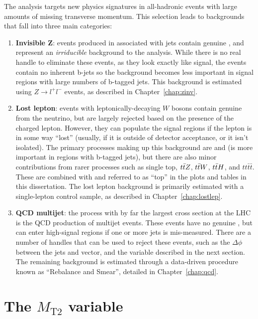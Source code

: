 The \mttwo analysis targets new physics signatures in all-hadronic events with large amounts of missing transverse momentum.
This selection leads to backgrounds that fall into three main categories:
\begin{enumerate}
\item \textbf{Invisible Z}: \znunu events produced in associated with jets contain genuine \ptmiss, and represent
an \emph{irriducible} background to the analysis. While there is no real handle to eliminate these events, as they
look exactly like signal, the events contain no inherent b-jets so the background becomes less important in
signal regions with large numbers of b-tagged jets. This background is estimated using $Z\to l^+l^-$ events,
as described in Chapter~\ref{chap:zinv}.
\item \textbf{Lost lepton}: events with leptonically-decaying $W$ bosons contain genuine \ptmiss from the neutrino, 
but are largely rejected based on the presence of the charged lepton.
However, they can populate the signal regions if the lepton is in some way ``lost'' (usually, if it is outside of detector acceptance,
or it isn't isolated). The primary processes making up this background are \ttbar and \wjets (\ttbar is more important in regions
with b-tagged jets), but there are also minor contributions from rarer processes such as single top, $t\bar{t} Z$, $t\bar{t} W$,
$t\bar{t} H$, and $tt\bar{t}\bar{t}$. These are combined with \ttbar and referred to as ``top'' in the plots and tables in this
dissertation. The lost lepton background is primarily estimated with a single-lepton control sample, as described in
Chapter~\ref{chap:lostlep}.
\item \textbf{QCD multijet}: the process with by far the largest cross section at the LHC is the QCD production of
multijet events. These events have no genuine \ptmiss, but can enter high-\ptmiss signal regions if one or more
jets is mis-measured. There are a number of handles that can be used to reject these events, such as the $\Delta\phi$
between the jets and \vMet vector, and the \mttwo variable described in the next section. The remaining background
is estimated through a data-driven procedure known as ``Rebalance and Smear'', detailed in Chapter~\ref{chap:qcd}.
\end{enumerate}

\section{The $M_\text{T2}$ variable}
\label{sec:mt2_variable}

